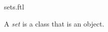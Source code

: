 \documentclass{stex}
\begin{document}
\begin{smodule}{sets.ftl}


\begin{fakeforthel}
  \begin{definition*}
    A \emph{set} is a class that is an object.
  \end{definition*}
\end{fakeforthel}

\end{smodule}
\end{document}
